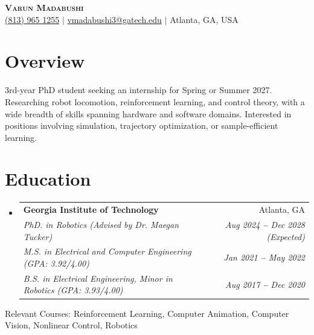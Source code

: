 \documentclass[letterpaper,11pt]{article}
\makeatletter
\newcommand{\resumeEducationHeading}[8]{
  \vspace{-2pt}\item
    \begin{tabular*}{0.97\textwidth}[t]{l@{\extracolsep{\fill}}r}
      \textbf{#1} & #2 \\
      \textit{\small#3} & \textit{\small #4} \\
      \textit{\small#5} & \textit{\small #6} \\
      \textit{\small#7} & \textit{\small #8} \\
    \end{tabular*}\vspace{-5pt}
}
\newcommand{\resumeSubHeadingListStart}{\begin{itemize}[leftmargin=0.15in, label={}]}
\newcommand{\resumeSubHeadingListEnd}{\end{itemize}}
\makeatother
\begin{document}

\begin{center}
    \textbf{\Huge \scshape Varun Madabushi } \\ \vspace{3pt}
    \small
    \faMobile \hspace{.5pt} \href{tel:+18139651255}{(813) 965 1255}
    $|$
    \faAt \hspace{.5pt}
    \href{mailto:vmadabushi3@gatech.edu}{vmadabushi3@gatech.edu}
    $|$
    \faMapMarker \hspace{.5pt} {Atlanta, GA, USA}
\end{center}



\section{Overview}
  3rd-year PhD student seeking an internship for Spring or Summer 2027. Researching robot locomotion, reinforcement learning, and control theory, with a wide breadth of skills spanning hardware and software domains.
  Interested in positions involving simulation, trajectory optimization, or sample-efficient learning.

\section{Education}
  \vspace{3pt}
  \resumeSubHeadingListStart
    
    \resumeEducationHeading
      {Georgia Institute of Technology}{Atlanta, GA}
      {PhD. in Robotics (Advised by Dr. Maegan Tucker)       }{Aug 2024 \textbf{--} Dec 2028 (Expected)}
      {M.S. in Electrical and Computer Engineering (GPA: 3.92/4.00)        }{Jan 2021 \textbf{--} May 2022}
      {B.S. in Electrical Engineering, Minor in Robotics (GPA: 3.93/4.00)   }{Aug 2017 \textbf{--} Dec 2020}
  \resumeSubHeadingListEnd
  Relevant Courses: Reinforcement Learning, Computer Animation, Computer Vision, Nonlinear Control, Robotics

\end{document}
